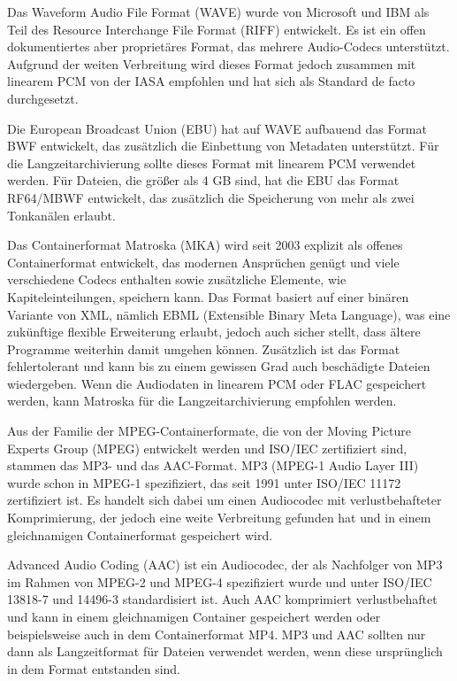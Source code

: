 Das Waveform Audio File Format (WAVE) wurde von Microsoft und IBM als Teil des Resource Interchange File Format (RIFF) entwickelt. Es ist ein offen dokumentiertes aber proprietäres Format, das mehrere Audio-Codecs unterstützt. Aufgrund der weiten Verbreitung wird dieses Format jedoch zusammen mit linearem PCM von der IASA empfohlen und hat sich als Standard de facto durchgesetzt.

Die European Broadcast Union (EBU) hat auf WAVE aufbauend das Format BWF entwickelt, das zusätzlich die Einbettung von Metadaten unterstützt. Für die Langzeitarchivierung sollte dieses Format mit linearem PCM verwendet werden. Für Dateien, die größer als 4 GB sind, hat die EBU das Format RF64/MBWF entwickelt, das zusätzlich die Speicherung von mehr als zwei Tonkanälen erlaubt.

Das Containerformat Matroska (MKA) wird seit 2003 explizit als offenes Containerformat entwickelt, das modernen Ansprüchen genügt und viele verschiedene Codecs enthalten sowie zusätzliche Elemente, wie Kapiteleinteilungen, speichern kann. Das Format basiert auf einer binären Variante von XML, nämlich EBML (Extensible Binary Meta Language), was eine zukünftige flexible Erweiterung erlaubt, jedoch auch sicher stellt, dass ältere Programme weiterhin damit umgehen können. Zusätzlich ist das Format fehlertolerant und kann bis zu einem gewissen Grad auch beschädigte Dateien wiedergeben. Wenn die Audiodaten in linearem PCM oder FLAC gespeichert werden, kann Matroska für die Langzeitarchivierung empfohlen werden.

Aus der Familie der MPEG-Containerformate, die von der Moving Picture Experts Group (MPEG) entwickelt werden und ISO/IEC zertifiziert sind, stammen das MP3- und das AAC-Format. MP3 (MPEG-1 Audio Layer III) wurde schon in MPEG-1 spezifiziert, das seit 1991 unter ISO/IEC 11172 zertifiziert ist. Es handelt sich dabei um einen Audiocodec mit verlustbehafteter Komprimierung, der jedoch eine weite Verbreitung gefunden hat und in einem gleichnamigen Containerformat gespeichert wird.

Advanced Audio Coding (AAC) ist ein Audiocodec, der als Nachfolger von MP3 im Rahmen von MPEG-2 und MPEG-4 spezifiziert wurde und unter ISO/IEC 13818-7 und 14496-3 standardisiert ist. Auch AAC komprimiert verlustbehaftet und kann in einem gleichnamigen Container gespeichert werden oder beispielsweise auch in dem Containerformat MP4. MP3 und AAC sollten nur dann als Langzeitformat für Dateien verwendet werden, wenn diese ursprünglich in dem Format entstanden sind.

